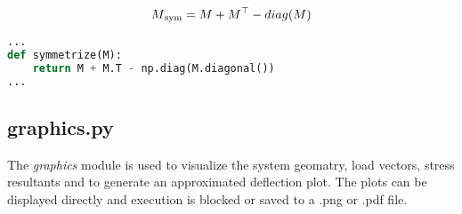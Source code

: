 \begin{equation} \label{symmetrize}
    M\textsubscript{sym} = M + M^\top - diag(M)
\end{equation}


\begin{inconsolata}
\begin{minipage}{\linewidth}
\begin{lstlisting}[language=python]
...
def symmetrize(M):
    return M + M.T - np.diag(M.diagonal())
...
\end{lstlisting}
\end{minipage}
\end{inconsolata}


\subsection{graphics.py}
\label{subsec:graphics.py}

The \textit{graphics} module is used to visualize the system geomatry, load vectors, stress resultants and to generate an approximated deflection plot.
The plots can be displayed directly and execution is blocked or saved to a .png or .pdf file.

